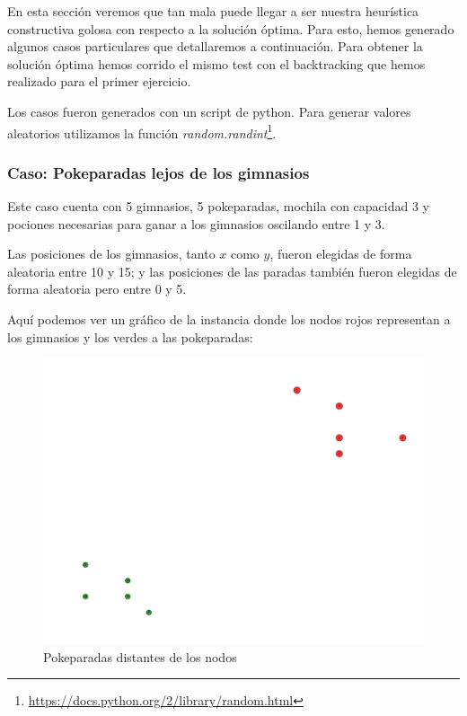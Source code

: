 En esta sección veremos que tan mala puede llegar a ser nuestra heurística constructiva golosa con respecto a la solución óptima. Para esto, hemos generado algunos casos particulares que detallaremos a continuación. Para obtener la solución óptima hemos corrido el mismo test con el backtracking que hemos realizado para el primer ejercicio.

Los casos fueron generados con un script de python. Para generar valores aleatorios utilizamos la función \textit{random.randint}\footnote{\url{https://docs.python.org/2/library/random.html}}.

\subsubsection{Caso: Pokeparadas lejos de los gimnasios}

Este caso cuenta con 5 gimnasios, 5 pokeparadas, mochila con capacidad 3 y pociones necesarias para ganar a los gimnasios oscilando entre 1 y 3.

Las posiciones de los gimnasios, tanto $x$ como $y$, fueron elegidas de forma aleatoria entre 10 y 15; y las posiciones de las paradas también fueron elegidas de forma aleatoria pero entre 0 y 5. 

Aquí podemos ver un gráfico de la instancia donde los nodos rojos representan a los gimnasios y los verdes a las pokeparadas:

\begin{figure}[H]
  \begin{center}
    \includegraphics[scale=0.4]{imagenes/test1.pdf}
    \caption{Pokeparadas distantes de los nodos}
    \label{fig:ej2_caso1}
  \end{center}
\end{figure}


